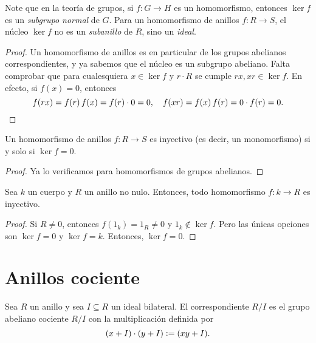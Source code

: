 Note que en la teoría de grupos, si $f\colon G\to H$ es un homomorfismo,
entonces $\ker f$ es un \emph{subgrupo normal} de $G$. Para un homomorfismo
de anillos $f\colon R\to S$, el núcleo $\ker f$ no es un \emph{subanillo} de
$R$, sino un \emph{ideal}.

\begin{proof}
  Un homomorfismo de anillos es en particular de los grupos abelianos
  correspondientes, y ya sabemos que el núcleo es un subgrupo abeliano.
  Falta comprobar que para cualesquiera $x\in \ker f$ y $r\cdot R$ se cumple
  $rx, xr \in \ker f$. En efecto, si $f (x) = 0$, entonces
  \[ f (rx) = f (r)\,f(x) = f (r)\cdot 0 = 0, \quad
     f (xr) = f (x)\,f(r) = 0\cdot f (r) = 0. \qedhere \]
\end{proof}

\begin{observacion}
  Un homomorfismo de anillos $f\colon R\to S$ es inyectivo (es decir,
  un monomorfismo) si y solo si $\ker f = 0$.

  \begin{proof}
    Ya lo verificamos para homomorfismos de grupos abelianos.
  \end{proof}
\end{observacion}

\begin{observacion}
  Sea $k$ un cuerpo y $R$ un anillo no nulo. Entonces, todo homomorfismo
  $f\colon k\to R$ es inyectivo.

  \begin{proof}
    Si $R \ne 0$, entonces $f (1_k) = 1_R \ne 0$ y $1_k \notin \ker f$. Pero las
    únicas opciones son $\ker f = 0$ y $\ker f = k$. Entonces, $\ker f = 0$.
  \end{proof}
\end{observacion}


\section{Anillos cociente}

\begin{definicion}
  Sea $R$ un anillo y sea $I \subseteq R$ un ideal bilateral.
  El 
  correspondiente $R/I$ es el grupo abeliano cociente $R/I$ con
  la multiplicación definida por
  $$(x + I)\cdot (y + I) \mathrel{\mathop:}= (x y + I).$$
\end{definicion}

